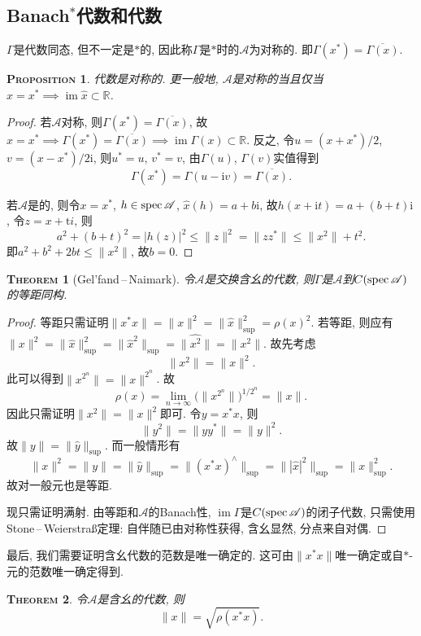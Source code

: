 \documentclass{ctexart}
\makeatletter
\newcommand\<{\@ifstar\@angle@star\@angle@nostar}
\newtheorem{theorem}{{\scshape Theorem}}[section]
\newtheorem{prop}{{\scshape Proposition}}[section]
\makeatother
\begin{document}
\subsection{Banach\/$^*$代数和\C*代数}
$\Gamma $是代数同态, 但不一定是$*$的, 因此称$\Gamma $是$*$时的$\mathscr A$为对称的. 即$\Gamma{(x^*)}=\overline{\Gamma{(x)}}$.
\begin{prop}
    \C*代数是对称的. 更一般地, $\mathscr A$是对称的当且仅当$x=x^*\implies \operatorname{im}\hat{x}\subset\mathbb R$.
\end{prop}
\begin{proof}
    若$\mathscr A$对称, 则$\Gamma{(x^*)}=\overline{\Gamma{(x)}}$, 故$x=x^*\implies \Gamma{(x^*)} = \overline{\Gamma{(x)}}\implies \operatorname{im}\Gamma{(x)}\subset\mathbb R$. 反之, 令$u=(x+x^*) / 2$, $v = (x-x^*) / 2\mathrm{i} $, 则$u^*=u$, $v^*=v$, 由$\Gamma (u)$, $\Gamma (v)$实值得到
    \[\Gamma (x^*)=\Gamma (u-\mathrm{i} v)= \overline{\Gamma (x)}.\]

    若$\mathscr A$是\C*的, 则令$x=x^*$, $h\in\sp\mathscr A$, $\hat{x}(h)=a+b\mathrm{i} $, 故$h(x+\mathrm{i} t)=a + (b+t)\mathrm{i} $, 令$z=x+\mathrm{t} i$, 则
    \[a^2+(b+t)^2 = |h(z)|^2\leqslant \|z\|^2 = \|zz^*\|\leqslant \|x^2\|+t^2.\]
    即$a^2+b^2+2bt \leqslant \|x^2\|$, 故$b=0$.
\end{proof}
\begin{theorem}[Gel'fand\,--\,Naimark]
    令$\mathscr A$是交换含幺的\C*代数, 则$\Gamma $是$\mathscr A$到$C(\sp \mathscr A)$的等距同构.
\end{theorem}
\begin{proof}
    等距只需证明$\|x^*x\|=\|x\|^2=\|\hat{x}\|^2_{\sup}=\rho (x)^2$. 若等距, 则应有$\|x\|^2=\|\hat{x}\|^2_{\sup}=\|\hat{x}^2\|_{\sup}=\|\hat{x^2}\|=\|x^2\|$. 故先考虑
    \[\|x^2\| = \|x\|^2.\]
    此可以得到$\|x^{2^n}\|=\|x\|^{2^n}$. 故
    \[\rho (x)= \lim_{n \to \infty}\bigl(\|x^{2^n}\|\bigr)^{1 / 2^n} = \|x\|.\]
    因此只需证明$\|x^2\| = \|x\|^2$即可. 令$y=x^*x$, 则
    \[\|y^2\|=\|yy^*\|=\|y\|^2.\]
    故$\|y\|=\|\hat{y}\|_{\sup}$. 而一般情形有
    \[\|x\|^2=\|y\|=\|\hat{y}\|_{\sup}=\|(x^*x)^\land\|_{\sup}=\||\hat{x}|^2\|_{\sup}=\|x\|_{\sup}^2.\]
    故对一般元也是等距.

    现只需证明满射. 由等距和$\mathscr A$的Banach性, $\operatorname{im}\Gamma $是$C(\sp\mathscr{ A})$的闭子代数, 只需使用Stone\,--\,Weierstraß定理: 自伴随已由对称性获得, 含幺显然, 分点来自对偶.
\end{proof}
最后, 我们需要证明含幺\C*代数的范数是唯一确定的. 这可由$\|x^*x\|$唯一确定或自$*$-元的范数唯一确定得到.
\begin{theorem}
    令$\mathscr A$是含幺的\C*代数, 则
    \[\|x\| = \sqrt{\rho (x^*x)}.\]
\end{theorem}
\end{document}

